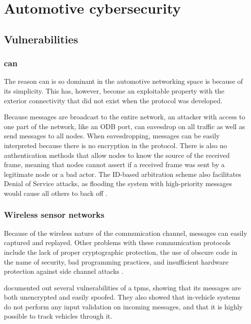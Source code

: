 \section{Automotive cybersecurity}

\subsection{Vulnerabilities}

\subsubsection{\gls{can}}

The reason \gls{can} is so dominant in the automotive networking space is because of its simplicity. This has, however, become an exploitable property with the exterior connectivity that did not exist when the protocol was developed.\par
Because messages are broadcast to the entire network, an attacker with access to one part of the network, like an ODB port, can eavesdrop on all traffic as well as send messages to all nodes. When eavesdropping, messages can be easily interpreted because there is no encryption in the protocol. There is also no authentication methods that allow nodes to know the source of the received frame, meaning that nodes cannot assert if a received frame was sent by a legitimate node or a bad actor. The ID-based arbitration scheme also facilitates Denial of Service attacks, as flooding the system with high-priority messages would cause all others to back off \citep{scalas2019automotive}.

\subsubsection{Wireless sensor networks}

Because of the wireless nature of the communication channel, messages can easily captured and replayed. Other problems with these communication protocols include the lack of proper cryptographic protection, the use of obscure code in the name of security, bad programming practices, and insufficient hardware protection against side channel attacks \citep{Le2018}.\par
\cite{rouf2010security} documented out several vulnerabilities of a \gls{tpms}, showing that its messages are both unencrypted and easily spoofed. They also showed that in-vehicle systems do not perform any input validation on incoming messages, and that it is highly possible to track vehicles through it.

